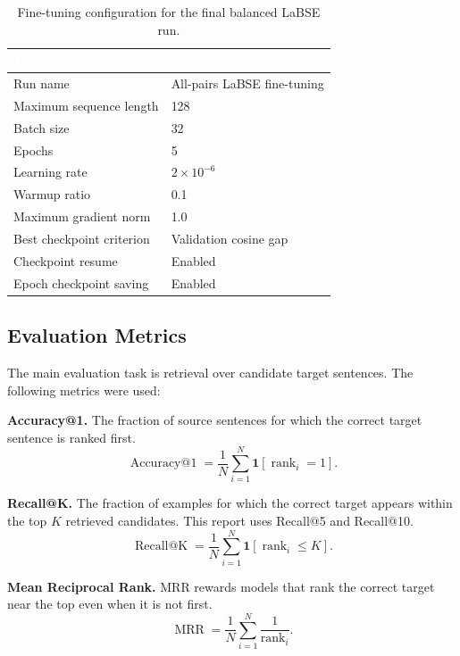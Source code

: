 \documentclass[12pt, a4paper]{article}
\begin{document}
\begin{table}[H]
\centering
\renewcommand{\arraystretch}{1.25}
\begin{tabular}{p{6.5cm} p{6cm}}
\toprule
\rowcolor{headerblue}
\textcolor{white}{\textbf{Training Parameter}} & \textcolor{white}{\textbf{Value}} \\
\midrule
\rowcolor{rowgray}
Run name & All-pairs LaBSE fine-tuning \\
Maximum sequence length & 128 \\
\rowcolor{rowgray}
Batch size & 32 \\
Epochs & 5 \\
\rowcolor{rowgray}
Learning rate & $2 \times 10^{-6}$ \\
Warmup ratio & 0.1 \\
\rowcolor{rowgray}
Maximum gradient norm & 1.0 \\
Best checkpoint criterion & Validation cosine gap \\
\rowcolor{rowgray}
Checkpoint resume & Enabled \\
Epoch checkpoint saving & Enabled \\
\bottomrule
\end{tabular}
\caption{Fine-tuning configuration for the final balanced LaBSE run.}
\label{tab:training_config}
\end{table}

\subsection{Evaluation Metrics}

The main evaluation task is retrieval over candidate target sentences. The following metrics were used:

\textbf{Accuracy@1.}
The fraction of source sentences for which the correct target sentence is ranked first.
\[
  \operatorname{Accuracy@1}
  =
  \frac{1}{N}\sum_{i=1}^{N}\mathbf{1}[\operatorname{rank}_i = 1].
\]

\textbf{Recall@K.}
The fraction of examples for which the correct target appears within the top $K$ retrieved candidates. This report uses Recall@5 and Recall@10.
\[
  \operatorname{Recall@K}
  =
  \frac{1}{N}\sum_{i=1}^{N}\mathbf{1}[\operatorname{rank}_i \leq K].
\]

\textbf{Mean Reciprocal Rank.}
MRR rewards models that rank the correct target near the top even when it is not first.
\[
  \operatorname{MRR}
  =
  \frac{1}{N}\sum_{i=1}^{N}\frac{1}{\operatorname{rank}_i}.
\]
\end{document}
